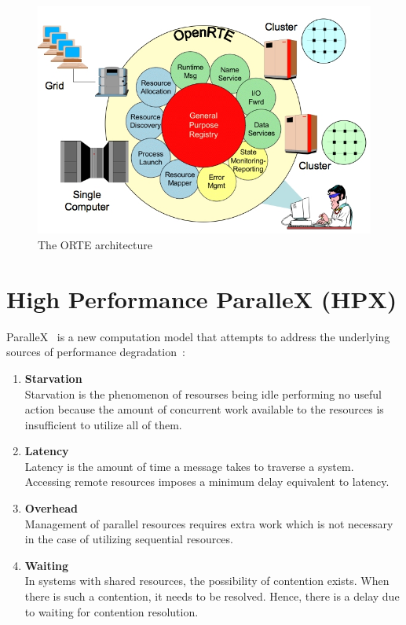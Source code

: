 \begin{figure}[h!]
\centering
\includegraphics[scale=0.5]{images/orte.png}
\caption{The ORTE architecture~\cite{hpcwire}}
\label{fig:orte-architecture}
\end{figure}

\section{High Performance ParalleX (HPX)}
\label{sec:hpx}
ParalleX~\cite{kaiser2009parallex} is a new computation model that attempts to address the underlying sources of performance degradation~\cite{sterling2010enabling}:

\begin{enumerate}
\item \textbf{Starvation}\\
  Starvation is the phenomenon of resourses being idle performing no useful action because the amount of concurrent work available to the resources is insufficient to utilize all of them.
\item \textbf{Latency}\\
  Latency is the amount of time a message takes to traverse a system. Accessing remote resources imposes a minimum delay equivalent to latency.
\item \textbf{Overhead}\\
  Management of parallel resources requires extra work which is not necessary in the case of utilizing sequential resources.
\item \textbf{Waiting}\\
  In systems with shared resources, the possibility of contention exists. When there is such a contention, it needs to be resolved. Hence, there is a delay due to waiting for contention resolution.
\end{enumerate}

